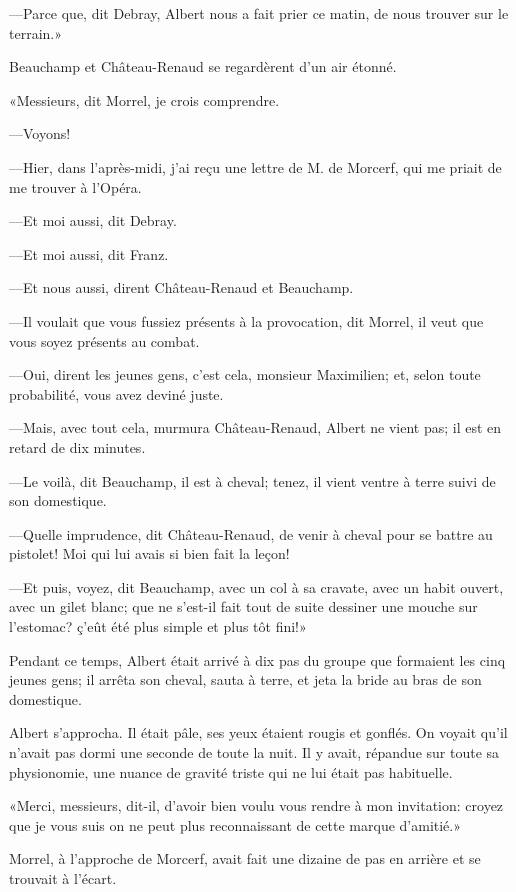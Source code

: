 —Parce que, dit Debray, Albert nous a fait prier ce matin, de nous trouver sur le terrain.» 

Beauchamp et Château-Renaud se regardèrent d'un air étonné. 

«Messieurs, dit Morrel, je crois comprendre. 

—Voyons! 

—Hier, dans l'après-midi, j'ai reçu une lettre de M. de Morcerf, qui me priait de me trouver à l'Opéra. 

—Et moi aussi, dit Debray. 

—Et moi aussi, dit Franz. 

—Et nous aussi, dirent Château-Renaud et Beauchamp. 

—Il voulait que vous fussiez présents à la provocation, dit Morrel, il veut que vous soyez présents au combat. 

—Oui, dirent les jeunes gens, c'est cela, monsieur Maximilien; et, selon toute probabilité, vous avez deviné juste. 

—Mais, avec tout cela, murmura Château-Renaud, Albert ne vient pas; il est en retard de dix minutes. 

—Le voilà, dit Beauchamp, il est à cheval; tenez, il vient ventre à terre suivi de son domestique. 

—Quelle imprudence, dit Château-Renaud, de venir à cheval pour se battre au pistolet! Moi qui lui avais si bien fait la leçon! 

—Et puis, voyez, dit Beauchamp, avec un col à sa cravate, avec un habit ouvert, avec un gilet blanc; que ne s'est-il fait tout de suite dessiner une mouche sur l'estomac? ç'eût été plus simple et plus tôt fini!» 

Pendant ce temps, Albert était arrivé à dix pas du groupe que formaient les cinq jeunes gens; il arrêta son cheval, sauta à terre, et jeta la bride au bras de son domestique. 

Albert s'approcha. Il était pâle, ses yeux étaient rougis et gonflés. On voyait qu'il n'avait pas dormi une seconde de toute la nuit. Il y avait, répandue sur toute sa physionomie, une nuance de gravité triste qui ne lui était pas habituelle. 

«Merci, messieurs, dit-il, d'avoir bien voulu vous rendre à mon invitation: croyez que je vous suis on ne peut plus reconnaissant de cette marque d'amitié.» 

Morrel, à l'approche de Morcerf, avait fait une dizaine de pas en arrière et se trouvait à l'écart. 

